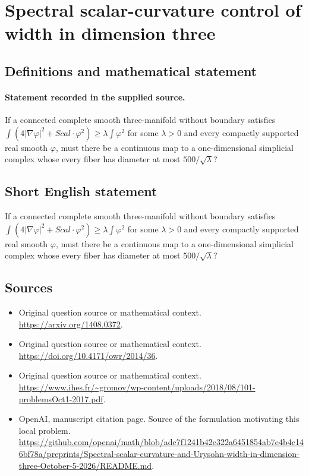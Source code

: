 \documentclass[11pt]{article}
\begin{document}
\section*{Spectral scalar-curvature control of width in dimension three}\label{30007160}
\subsection{Definitions and mathematical statement}
\paragraph{Statement recorded in the supplied source.}
If a connected complete smooth three-manifold without boundary satisfies $\int (4|\nabla \varphi |^{2}+Scal\cdot \varphi ^{2})\geq \lambda \int \varphi ^{2}$ for some $\lambda >0$ and every compactly supported real smooth $\varphi $, must there be a continuous map to a one-dimensional simplicial complex whose every fiber has diameter at most $500/\surd \lambda $?
\subsection{Short English statement}
If a connected complete smooth three-manifold without boundary satisfies $\int (4|\nabla \varphi |^{2}+Scal\cdot \varphi ^{2})\geq \lambda \int \varphi ^{2}$ for some $\lambda >0$ and every compactly supported real smooth $\varphi $, must there be a continuous map to a one-dimensional simplicial complex whose every fiber has diameter at most $500/\surd \lambda $?
\subsection{Sources}
\begin{itemize}
\item[S1] Original question source or mathematical context.
\url{https://arxiv.org/1408.0372}.
\item[S2] Original question source or mathematical context.
\url{https://doi.org/10.4171/owr/2014/36}.
\item[S3] Original question source or mathematical context.
\url{https://www.ihes.fr/~gromov/wp-content/uploads/2018/08/101-problemsOct1-2017.pdf}.
\item[S4] OpenAI, manuscript citation page. Source of the formulation motivating this local problem.
\url{https://github.com/openai/math/blob/adc7f1241b42e322a6451854ab7e4b4c146bf78a/preprints/Spectral-scalar-curvature-and-Urysohn-width-in-dimension-three-October-5-2026/README.md}.
\end{itemize}
\end{document}
